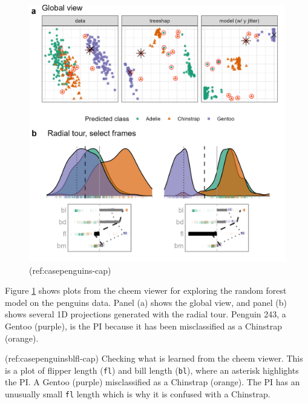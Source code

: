 \documentclass[
]{jss}
\begin{document}
\begin{CodeChunk}
\begin{figure}

{\centering \includegraphics[width=1\linewidth]{./figures/case_penguins} 

}

\caption[(ref:casepenguins-cap)]{(ref:casepenguins-cap)}\label{fig:casepenguins}
\end{figure}
\end{CodeChunk}

Figure \ref{fig:casepenguins} shows plots from the cheem viewer for
exploring the random forest model on the penguins data. Panel (a) shows
the global view, and panel (b) shows several 1D projections generated
with the radial tour. Penguin 243, a Gentoo (purple), is the PI because
it has been misclassified as a Chinstrap (orange).

(ref:casepenguinsblfl-cap) Checking what is learned from the cheem
viewer. This is a plot of flipper length (\texttt{fl}) and bill length
(\texttt{bl}), where an asterisk highlights the PI. A Gentoo (purple)
misclassified as a Chinstrap (orange). The PI has an unusually small
\texttt{fl} length which is why it is confused with a Chinstrap.
\end{document}
